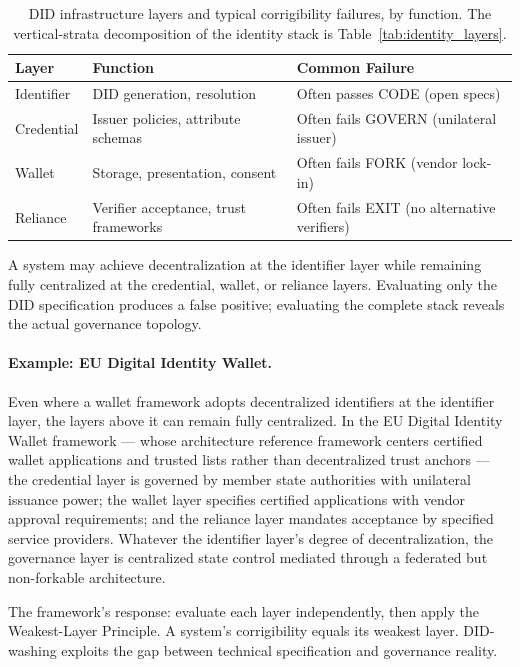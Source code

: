 \documentclass{article}
\begin{document}
\begin{table}[htbp]
\centering
\small
\caption{DID infrastructure layers and typical corrigibility failures, by function. The vertical-strata decomposition of the identity stack is Table~\ref{tab:identity_layers}.}
\label{tab:did_layers}
\begin{tabular}{@{}lp{5cm}p{5cm}@{}}
\toprule
\textbf{Layer} & \textbf{Function} & \textbf{Common Failure} \\
\midrule
Identifier & DID generation, resolution & Often passes CODE (open specs) \\
Credential & Issuer policies, attribute schemas & Often fails GOVERN (unilateral issuer) \\
Wallet & Storage, presentation, consent & Often fails FORK (vendor lock-in) \\
Reliance & Verifier acceptance, trust frameworks & Often fails EXIT (no alternative verifiers) \\
\bottomrule
\end{tabular}
\end{table}

A system may achieve decentralization at the identifier layer while remaining fully centralized at the credential, wallet, or reliance layers. Evaluating only the DID specification produces a false positive; evaluating the complete stack reveals the actual governance topology.

\paragraph{Example: EU Digital Identity Wallet.} Even where a wallet framework adopts decentralized identifiers at the identifier layer, the layers above it can remain fully centralized. In the EU Digital Identity Wallet framework \citep{eidas2024} --- whose architecture reference framework centers certified wallet applications and trusted lists rather than decentralized trust anchors --- the credential layer is governed by member state authorities with unilateral issuance power; the wallet layer specifies certified applications with vendor approval requirements; and the reliance layer mandates acceptance by specified service providers. Whatever the identifier layer's degree of decentralization, the governance layer is centralized state control mediated through a federated but non-forkable architecture.

The framework's response: evaluate each layer independently, then apply the Weakest-Layer Principle. A system's corrigibility equals its weakest layer. DID-washing exploits the gap between technical specification and governance reality.
\end{document}
